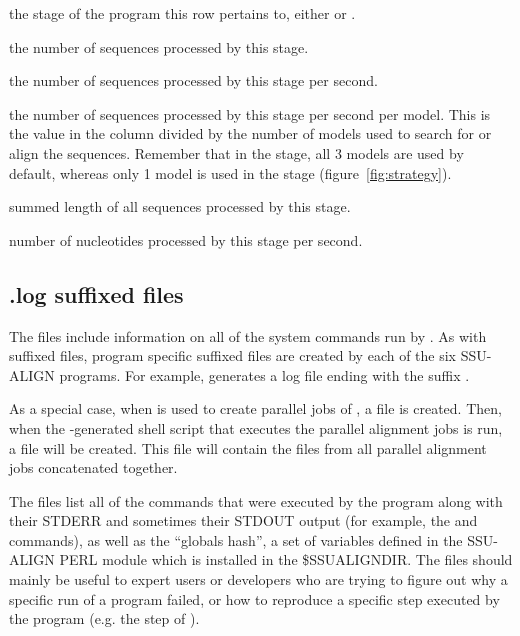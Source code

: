 \begin{wideitem}
\item[\emprog{stage}] the stage of the program this row pertains to,
  either  or .

\item[\emprog{num seqs}] the number of sequences processed by this stage.

\item[\emprog{seq/sec}] the number of sequences processed by this
  stage per second.

\item[\emprog{seq/sec/model}] the number of sequences processed by this
  stage per second per model. This is the value in the 
  column divided by the number of models used to search for or align
  the sequences. Remember that in the  stage, all 3
  models are used by default, whereas only 1 model is used in the
   stage (figure~\ref{fig:strategy}).

\item[\emprog{nucleotides}] summed length of all sequences processed
  by this stage.

\item[\emprog{nt/sec}] number of nucleotides processed by this stage
  per second.
\end{wideitem}

\subsection{.log suffixed files}

The  files include information on all of the system
commands run by . As with  suffixed files,
program specific  suffixed files are created by each of the
six SSU-ALIGN programs. For example, 
generates a log file ending with the suffix .


As a special case, when  is used to create parallel
jobs of , a  file is created. Then,
when the -generated shell script that executes the
parallel alignment jobs is run, a  file will be created.
This  file will contain the 
 files from all parallel alignment jobs
concatenated together.

The  files list all of the commands that were executed by
the program along with their STDERR and sometimes their STDOUT output
(for example, the  and  commands), as
well as the ``globals hash'', a set of variables defined in the
SSU-ALIGN PERL module  which is installed in the
\$SSUALIGNDIR. The  files should mainly be useful to expert 
users or developers who are trying to figure out why a specific run of a
program failed, or how to reproduce a specific step executed by the
program (e.g. the  step of ).

